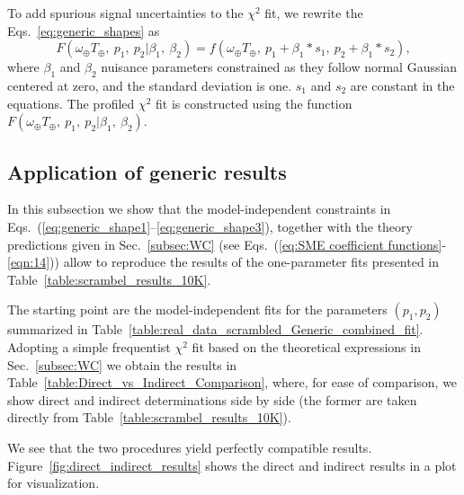 To add spurious signal uncertainties to the $\chi^{2}$ fit, 
we rewrite the Eqs.~\eqref{eq:generic_shapes} as
\begin{equation}
F(\omega_\oplus T_\oplus,\ p_1,\ p_2| \beta_{1},\ \beta_{2}) 
= f(\omega_\oplus T_\oplus,\ p_1+\beta_{1}*s_1, \ p_2+\beta_{1}*s_2), 
\end{equation}
where $\beta_{1}$ and $\beta_{2}$ nuisance parameters constrained as they
follow normal Gaussian centered at zero, 
and the standard deviation is one. 
$s_{1}$ and $s_{2}$ are constant in the equations.
The profiled $\chi^{2}$ fit is constructed using the function 
$F(\omega_\oplus T_\oplus,\ p_1,\ p_2| \beta_{1},\ \beta_{2})$. 




\subsection{Application of generic results}

In this subsection we show that the 
model-independent constraints in 
Eqs.~(\ref{eq:generic_shape1}--\ref{eq:generic_shape3}), 
together with the theory predictions given in 
Sec.~\ref{subsec:WC} 
(see Eqs.~(\ref{eq:SME coefficient functions}-\ref{eqn:14})) 
allow to reproduce the results of the 
one-parameter fits presented in Table~\ref{table:scrambel_results_10K}.

The starting point are the model-independent 
fits for the parameters $(p_1,p_2)$ summarized in 
Table~\ref{table:real_data_scrambled_Generic_combined_fit}. 
Adopting a simple frequentist $\chi^2$ fit 
based on the theoretical expressions in 
Sec.~\ref{subsec:WC} we obtain the 
results in Table~\ref{table:Direct_vs_Indirect_Comparison}, 
where, for ease of comparison, we show 
direct and indirect determinations side 
by side (the former are taken directly from 
Table~\ref{table:scrambel_results_10K}).

We see that the two procedures yield perfectly compatible results. 
Figure~\ref{fig:direct_indirect_results} shows the direct and indirect
 results in a plot for visualization.

